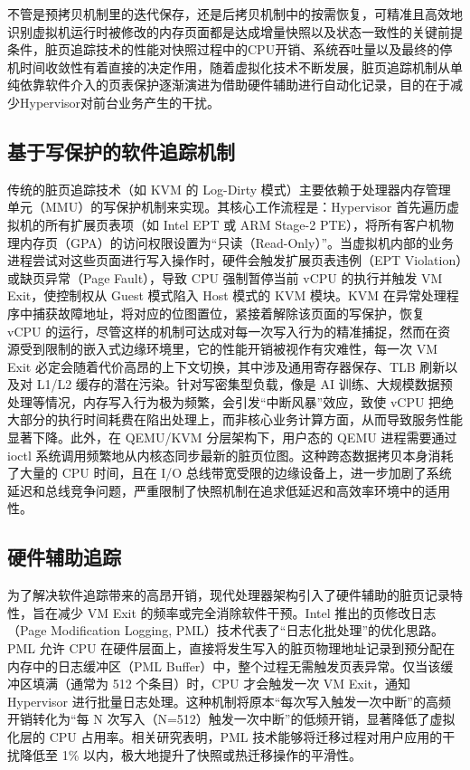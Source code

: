 不管是预拷贝机制里的迭代保存，还是后拷贝机制中的按需恢复，可精准且高效地识别虚拟机运行时被修改的内存页面都是达成增量快照以及状态一致性的关键前提条件，脏页追踪技术的性能对快照过程中的CPU开销、系统吞吐量以及最终的停机时间收敛性有着直接的决定作用，随着虚拟化技术不断发展，脏页追踪机制从单纯依靠软件介入的页表保护逐渐演进为借助硬件辅助进行自动化记录，目的在于减少Hypervisor对前台业务产生的干扰。

\subsection{基于写保护的软件追踪机制}

传统的脏页追踪技术（如 KVM 的 Log-Dirty 模式）主要依赖于处理器内存管理单元（MMU）的写保护机制来实现\cite{wang2014vm}。其核心工作流程是：Hypervisor 首先遍历虚拟机的所有扩展页表项（如 Intel EPT 或 ARM Stage-2 PTE），将所有客户机物理内存页（GPA）的访问权限设置为“只读（Read-Only）”。当虚拟机内部的业务进程尝试对这些页面进行写入操作时，硬件会触发扩展页表违例（EPT Violation）或缺页异常（Page Fault），导致 CPU 强制暂停当前 vCPU 的执行并触发 VM Exit，使控制权从 Guest 模式陷入 Host 模式的 KVM 模块\cite{uhlig2005intel}。KVM 在异常处理程序中捕获故障地址，将对应的位图置位，紧接着解除该页面的写保护，恢复 vCPU 的运行，尽管这样的机制可达成对每一次写入行为的精准捕捉，然而在资源受到限制的嵌入式边缘环境里，它的性能开销被视作有灾难性，每一次 VM Exit 必定会随着代价高昂的上下文切换，其中涉及通用寄存器保存、TLB 刷新以及对 L1/L2 缓存的潜在污染。针对写密集型负载，像是 AI 训练、大规模数据预处理等情况，内存写入行为极为频繁，会引发“中断风暴”效应，致使 vCPU 把绝大部分的执行时间耗费在陷出处理上，而非核心业务计算方面，从而导致服务性能显著下降\cite{wu2016hot}。此外，在 QEMU/KVM 分层架构下，用户态的 QEMU 进程需要通过 ioctl 系统调用频繁地从内核态同步最新的脏页位图。这种跨态数据拷贝本身消耗了大量的 CPU 时间，且在 I/O 总线带宽受限的边缘设备上，进一步加剧了系统延迟和总线竞争问题，严重限制了快照机制在追求低延迟和高效率环境中的适用性\cite{kivity2007kvm}。


\subsection{硬件辅助追踪}

为了解决软件追踪带来的高昂开销，现代处理器架构引入了硬件辅助的脏页记录特性，旨在减少 VM Exit 的频率或完全消除软件干预\cite{wu2016hot}。Intel 推出的页修改日志（Page Modification Logging, PML）技术代表了“日志化批处理”的优化思路\cite{intel_pml_arxiv}。PML 允许 CPU 在硬件层面上，直接将发生写入的脏页物理地址记录到预分配在内存中的日志缓冲区（PML Buffer）中，整个过程无需触发页表异常。仅当该缓冲区填满（通常为 512 个条目）时，CPU 才会触发一次 VM Exit，通知 Hypervisor 进行批量日志处理。这种机制将原本“每次写入触发一次中断”的高频开销转化为“每 N 次写入（N=512）触发一次中断”的低频开销，显著降低了虚拟化层的 CPU 占用率。相关研究表明，PML 技术能够将迁移过程对用户应用的干扰降低至 1\% 以内，极大地提升了快照或热迁移操作的平滑性\cite{xu2019pmlperf}。

